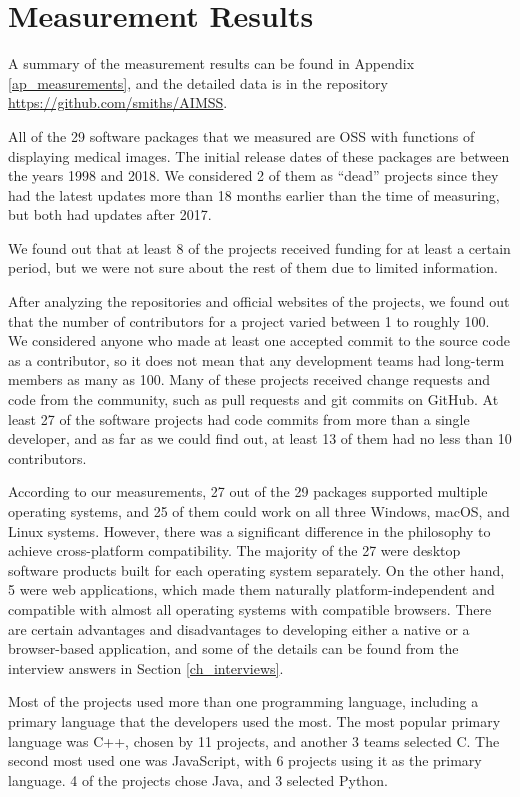 \chapter{Measurement Results}
\label{ch_results}

A summary of the measurement results can be found in Appendix \ref{ap_measurements}, and the detailed data is in the repository \hyperlink{https://github.com/smiths/AIMSS}{https://github.com/smiths/AIMSS}.

All of the 29 software packages that we measured are OSS with functions of displaying medical images. The initial release dates of these packages are between the years 1998 and 2018. We considered 2 of them as ``dead'' projects since they had the latest updates more than 18 months earlier than the time of measuring, but both had updates after 2017.

We found out that at least 8 of the projects received funding for at least a certain period, but we were not sure about the rest of them due to limited information. 

After analyzing the repositories and official websites of the projects, we found out that the number of contributors for a project varied between 1 to roughly 100. We considered anyone who made at least one accepted commit to the source code as a contributor, so it does not mean that any development teams had long-term members as many as 100. Many of these projects received change requests and code from the community, such as pull requests and git commits on GitHub. At least 27 of the software projects had code commits from more than a single developer, and as far as we could find out, at least 13 of them had no less than 10 contributors.

According to our measurements, 27 out of the 29 packages supported multiple operating systems, and 25 of them could work on all three Windows, macOS, and Linux systems. However, there was a significant difference in the philosophy to achieve cross-platform compatibility. The majority of the 27 were desktop software products built for each operating system separately. On the other hand, 5 were web applications, which made them naturally platform-independent and compatible with almost all operating systems with compatible browsers. There are certain advantages and disadvantages to developing either a native or a browser-based application, and some of the details can be found from the interview answers in Section \ref{ch_interviews}.

Most of the projects used more than one programming language, including a primary language that the developers used the most. The most popular primary language was C++, chosen by 11 projects, and another 3 teams selected C. The second most used one was JavaScript, with 6 projects using it as the primary language. 4 of the projects chose Java, and 3 selected Python.

